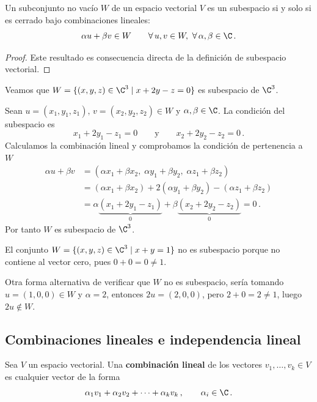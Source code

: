 \begin{theo}
  \label{prop:caracterizacion-subespacio}
  Un subconjunto no vacío $W$ de un espacio vectorial $V$ es un subespacio si y solo si es cerrado bajo combinaciones lineales:
  \[
    \alpha u + \beta v \in W \qquad \forall\, u,v\in W,\ \forall\, \alpha,\beta\in\C\,.
  \]
\end{theo}
\begin{proof}
  Este resultado es consecuencia directa de la definición de subespacio vectorial.
\end{proof}

\begin{eje}
  Veamos que $W = \{(x,y,z)\in\C^3 \mid x + 2y - z = 0\}$ es subespacio de $\C^3$.

  Sean $u=(x_1,y_1,z_1),\,v=(x_2,y_2,z_2)\in W$ y $\alpha,\beta\in\C$. La condición del subespacio es
  \[
    x_1+2y_1-z_1 = 0 \qquad \text{y} \qquad x_2+2y_2-z_2 = 0\,.
  \]
  Calculamos la combinación lineal y comprobamos la condición de pertenencia a $W$
  \begin{align*}
    \alpha u + \beta v & = (\alpha x_1+\beta x_2,\; \alpha y_1+\beta y_2,\; \alpha z_1+\beta z_2)              \\
                       & =(\alpha x_1+\beta x_2)+2(\alpha y_1+\beta y_2)-(\alpha z_1+\beta z_2)                \\
                       & = \alpha\underbrace{(x_1+2y_1-z_1)}_{0} + \beta\underbrace{(x_2+2y_2-z_2)}_{0} = 0\,.
  \end{align*}
  Por tanto $W$ es subespacio de $\C^3$.
\end{eje}

\begin{eje}
  El conjunto $W = \{(x,y,z)\in\C^3 \mid x+y = 1\}$ no es subespacio porque no contiene al vector cero, pues $0+0 = 0\neq 1$.

  Otra forma alternativa de verificar que $W$ no es subespacio, sería tomando $u = (1,0,0)\in W$ y $\alpha = 2$, entonces $2u = (2,0,0)$, pero $2+0 = 2\neq 1$, luego $2u\notin W$.
\end{eje}

\subsection{Combinaciones lineales e independencia lineal}

\begin{defi}
  Sea $V$ un espacio vectorial. Una \textbf{combinación lineal} de los vectores $v_1,\ldots,v_k\in V$ es cualquier vector de la forma
  \[
    \alpha_1 v_1 + \alpha_2 v_2 + \cdots + \alpha_k v_k\,,\qquad \alpha_i\in\C\,.
  \]
\end{defi}

